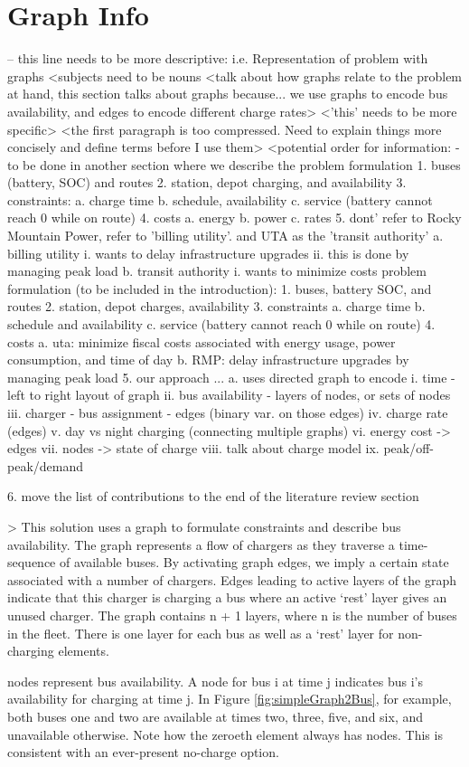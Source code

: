 \section{Graph Info} -- this line needs to be more descriptive: i.e. Representation of problem with graphs
<subjects need to be nouns
<talk about how graphs relate to the problem at hand, this section talks about graphs because... we use graphs to encode bus availability, and edges to encode different charge rates>
<'this' needs to be more specific>
<the first paragraph is too compressed.  Need to explain things more concisely and define terms before I use them>
<potential order for information: - to be done in another section where we describe the problem formulation
    1. buses (battery, SOC) and routes
    2. station, depot charging, and availability
    3. constraints:
        a. charge time
	b. schedule, availability
	c. service (battery cannot reach 0 while on route)
    4. costs
        a. energy 
	b. power
	c. rates
    5. dont' refer to Rocky Mountain Power, refer to 'billing utility'.  and UTA as the 'transit authority'
        a. billing utility
	    i. wants to delay infrastructure upgrades
	    ii. this is done by managing peak load
	b. transit authority
	    i. wants to minimize costs
problem formulation (to be included in the introduction):
1. buses, battery SOC, and routes
2. station, depot charges, availability
3. constraints
    a. charge time
    b. schedule and availability
    c. service (battery cannot reach 0 while on route)
4. costs
    a. uta: minimize fiscal costs associated with energy usage, power consumption, and time of day
    b. RMP: delay infrastructure upgrades by managing peak load
5. our approach ...
    a. uses directed graph to encode
        i. time -left to right layout of graph
	ii. bus availability - layers of nodes, or sets of nodes
	iii. charger - bus assignment - edges (binary var. on those edges)
	iv. charge rate (edges) 
	v. day vs night charging (connecting multiple graphs)
	vi. energy cost -> edges
	vii. nodes -> state of charge
	viii. talk about charge model
	ix. peak/off-peak/demand

6. move the list of contributions to the end of the literature review section


>
This solution uses a graph to formulate constraints and describe bus availability. The graph represents a flow of chargers as they traverse a time-sequence of available buses.  By activating graph edges, we imply a certain state associated with a number of chargers. Edges leading to active layers of the graph indicate that this charger is charging a bus where an active `rest' layer gives an unused charger. The graph contains n + 1 layers, where n is the number of buses in the fleet.  There is one layer for each bus as well as a `rest' layer for non-charging elements.
\par nodes represent bus availability.  A node for bus i at time j indicates bus i's availability for charging at time j.  In Figure \ref{fig:simpleGraph2Bus}, for example, both buses one and two are available at times two, three, five, and six, and unavailable otherwise.  Note how the zeroeth element always has nodes.  This is consistent with an ever-present no-charge option.

